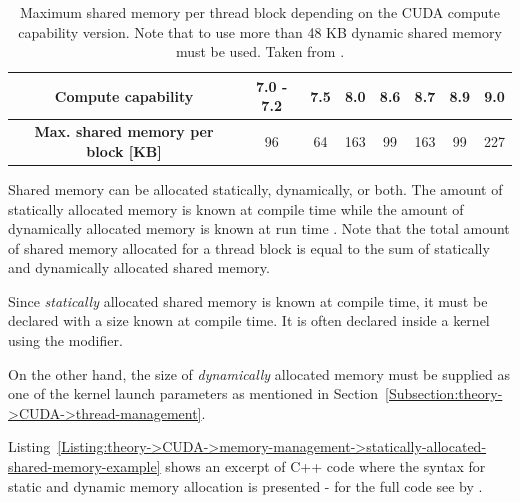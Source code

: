 \begin{table}[ht!]
	\centering
	\begin{tabular}{|c|c|c|c|c|c|c|c|}
		\hline
		\cellcolor[HTML]{C0C0C0}\textbf{Compute capability}                & 7.0 - 7.2 & 7.5 & 8.0 & 8.6 & 8.7 & 8.9 & 9.0 \\ \hline
		\cellcolor[HTML]{C0C0C0}\textbf{Max. shared memory per block [KB]} &    96     & 64  & 163 & 99  & 163 & 99  & 227 \\ \hline
	\end{tabular}
	\caption{Maximum shared memory per thread block depending on the CUDA compute capability version.
		Note that to use more than 48 KB dynamic shared memory must be used.
		Taken from  \cite{NVIDIADecember2022}.
	}
	\label{Table:theory->CUDA->memory-management->max-shared-memory-per-block-based-on-compute-capability}
\end{table}

Shared memory can be allocated statically, dynamically, or both.
The amount of statically allocated memory is known at compile time while the amount of dynamically allocated memory is known at run time \cite{Harris28January2013}.
Note that the total amount of shared memory allocated for a thread block is equal to the sum of statically and dynamically allocated shared memory.

Since \textit{statically} allocated shared memory is known at compile time, it must be declared with a size known at compile time.
It is often declared inside a kernel using the  modifier.

On the other hand, the size of \textit{dynamically} allocated memory must be supplied as one of the kernel launch parameters as mentioned in Section~\ref{Subsection:theory->CUDA->thread-management}.

Listing~\ref{Listing:theory->CUDA->memory-management->statically-allocated-shared-memory-example} shows an excerpt of C++ code where the syntax for static and dynamic memory allocation is presented - for the full code see  by  \cite{Harris28January2013}.

